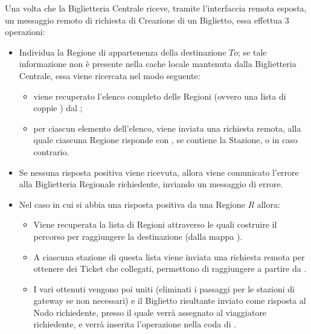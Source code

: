 	Una volta che la Biglietteria Centrale riceve, tramite l'interfaccia remota esposta, un messaggio remoto di richiesta di Creazione di un Biglietto, essa effettua 3 operazioni:
	\begin{itemize}
		\item Individua la Regione di appartenenza della destinazione $To$; se tale informazione non è presente nella cache locale mantenuta dalla Biglietteria Centrale, essa viene ricercata nel modo seguente: 
			\begin{itemize}
				\item viene recuperato l'elenco completo delle Regioni (ovvero una lista di coppie ) dal ;
				\item per ciascun elemento dell'elenco, viene inviata una richiesta remota, alla quale ciascuna Regione risponde con , se contiene la Stazione, o  in caso contrario.
			\end{itemize}
		\item Se nessuna risposta positiva viene ricevuta, allora viene comunicato l'errore alla Biglietteria Regionale richiedente, inviando un messaggio di errore.
		\item Nel caso in cui si abbia una risposta positiva da una Regione $R$ allora:
			\begin{itemize}
				\item Viene recuperata la lista di Regioni attraverso le quali costruire il percorso per raggiungere la destinazione (dalla mappa ). 
				\item A ciascuna stazione di questa lista viene inviata una richiesta remota  per ottenere dei Ticket che collegati, permettono di raggiungere  a partire da .
				\item I vari  ottenuti vengono poi uniti (eliminati i passaggi per le stazioni di gateway se non necessari) e il Biglietto risultante inviato come risposta al Nodo richiedente, presso il quale verrà assegnato al viaggiatore richiedente, e verrà inserita l'operazione  nella coda di .
			\end{itemize}
	\end{itemize}

